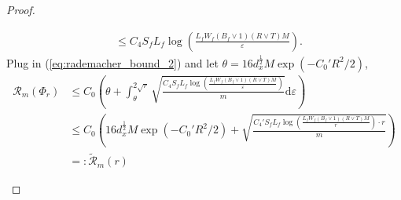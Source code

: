 \documentclass{article}
\numberwithin{equation}{section}
\def\eqref#1{equation~\ref{#1}}
\newcommand{\dif}{\mathrm{d}}
\theoremstyle{definition}
\renewcommand{\eqref}[1]{(\ref{#1})}
\begin{document}
\begin{proof}
\begin{enumerate}[label=\textbf{Step \arabic*.}]
\begin{equation}
\begin{aligned}
                    &\leq C_4S_fL_f\log\left(\frac{L_fW_f(B_f\vee 1)(R\vee T)M}{\varepsilon}\right).
                \end{aligned}
            \end{equation}
            Plug in \eqref{eq:rademacher_bound_2} and let $\theta=16d_x^{\frac{1}{2}}M\exp(-C_0'R^2/2)$,
            \begin{equation}
                \begin{aligned}
                    \mathcal{R}_m(\Phi_r)
                    &\leq C_0\left(\theta+\int_\theta^{2\sqrt{r}}\sqrt{\frac{C_4S_fL_f\log\left(\frac{L_fW_f(B_f\vee 1)(R\vee T)M}{\varepsilon}\right)}{m}}\dif\varepsilon\right) \\
                    &\leq C_0\left(16d_x^{\frac{1}{2}}M\exp(-C_0'R^2/2)+\sqrt{\frac{C_4'S_fL_f\log\left(\frac{L_fW_f(B_f\vee 1)(R\vee T)M}{r}\right)\cdot r}{m}}\right) \\
                    &=: \widetilde{\mathcal{R}}_m(r)
                \end{aligned}
            \end{equation}
    \end{enumerate}
    

\end{proof}
\end{document}

